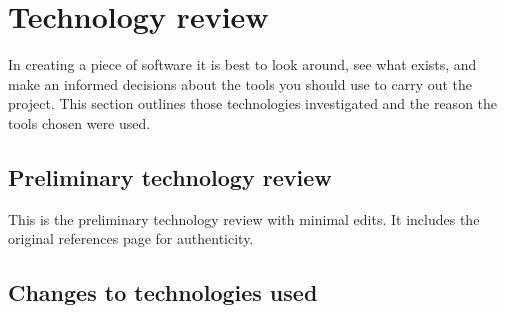 \section{Technology review}

In creating a piece of software it is best to look around, see what exists, and make an informed decisions about the tools you should use to carry out the project.
This section outlines those technologies investigated and the reason the tools chosen were used.

\subsection{Preliminary technology review}

This is the preliminary technology review with minimal edits.
It includes the original references page for authenticity.















\subsection{Changes to technologies used}

